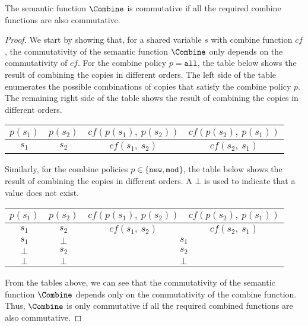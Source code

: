 \begin{theorem}
	\label{thm:commutative_combine}
	The semantic function $\Combine$ is commutative if all the 
	required combine functions are also commutative.
\end{theorem}
\begin{proof}
	We start by showing that, for a shared variable $s$ with 
	combine function $cf$, the commutativity of the semantic function 
	$\Combine$ only depends on the commutativity of $cf$. For the 
	combine policy $p = \mathtt{all}$, the table below shows the 
	result of combining the copies in different orders. The 
	left side of the table enumerates the possible combinations of 
	copies that satisfy the combine policy $p$. The remaining right 
	side of the table shows the result of combining the copies in
	different orders.
	\begin{center}
		\begin{tabular}{| c c || c | c |}
			\hline
			\boldmath$p(s_1)$	& \boldmath$p(s_2)$	& \boldmath$cf(p(s_1),~p(s_2))$	& \boldmath$cf(p(s_2),~p(s_1))$	\\ 
			\hline
			$s_1$				& $s_2$				& $cf(s_1,~s_2)$				& $cf(s_2,~s_1)$				\\
			\hline
		\end{tabular}
	\end{center}
	Similarly, for the combine policies $p \in \{\mathtt{new}, \mathtt{mod}\}$, the 
	table below shows the result of combining the copies in 
	different orders. A $\bot$ is used to indicate that a value 
	does not exist.
	\begin{center}
		\begin{tabular}{| c c || c | c |}
			\hline
			\boldmath$p(s_1)$	& \boldmath$p(s_2)$	& \boldmath$cf(p(s_1),~p(s_2))$	& \boldmath$cf(p(s_2),~p(s_1))$	\\ 
			\hline
			$s_1$				& $s_2$				& $cf(s_1,~s_2)$				& $cf(s_2,~s_1)$				\\ \hline
			$s_1$				& $\bot$			& \multicolumn{2}{c|}{$s_1$}									\\ \hline			
			$\bot$				& $s_2$				& \multicolumn{2}{c|}{$s_2$}									\\ \hline			
			$\bot$				& $\bot$			& \multicolumn{2}{c|}{$\bot$}									\\			
			\hline
		\end{tabular}
	\end{center}
	From the tables above, we can see that the commutativity
	of the semantic function $\Combine$ depends only on the 
	commutativity of the combine function.
	Thus, $\Combine$ is only commutative
	if all the required combined functions are also commutative.
\end{proof}

